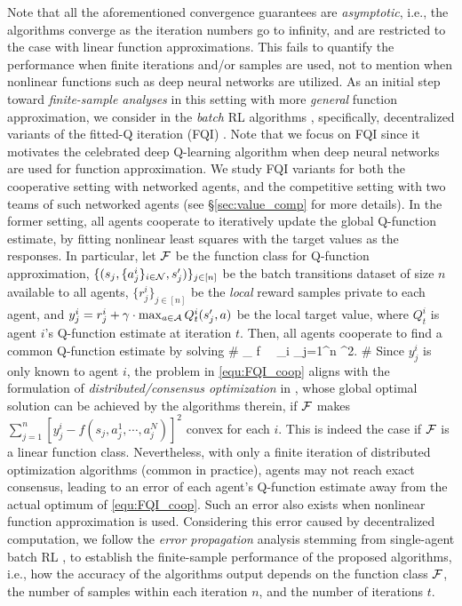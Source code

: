 Note that all the aforementioned convergence guarantees are \emph{asymptotic}, i.e., the algorithms converge as the iteration  numbers go to infinity, and are restricted to the case with linear function approximations. This fails to quantify the performance when  finite iterations and/or samples are used, not to mention when nonlinear functions such as deep neural networks are utilized. As an initial step toward \emph{finite-sample analyses} in this setting with  more \emph{general} function approximation, we consider   in \cite{zhang2018finite} the \emph{batch} RL algorithms \cite{lange2012batch}, specifically, decentralized variants of the fitted-Q iteration (FQI) \cite{riedmiller2005neural,antos2008fitted}. Note that we focus on FQI since it  motivates the celebrated deep Q-learning algorithm \cite{mnih2015human} when  deep neural networks are used for function approximation. 
We study FQI variants for both the cooperative setting with networked agents, and the competitive setting with two teams of such networked agents (see \S\ref{sec:value_comp} for more details). In the former setting,   all agents cooperate to iteratively update the global Q-function estimate, by fitting nonlinear least squares with the target values as the responses. In particular, let $\mathcal{F}$ be the  function class for Q-function approximation, $\{(s_j,\{a^i_j\}_{i\in\mathcal{N}},s_{j}')\}_{j\in[n]}$ be the batch transitions dataset of size $n$  available to all agents, $\{r^i_j\}_{j\in[n]}$ be the \emph{local} reward samples private to each agent, and $y^i_j=r^i_j+\gamma\cdot \max_{a\in\mathcal{A}}Q^i_t(s_{j}',a)$  be the local target value, where $Q^i_t$ is agent $i$'s Q-function estimate at iteration  $t$. Then,  all agents cooperate to find a common Q-function estimate by  solving
\#\label{equ:FQI_coop}
\min_{ f\in \cF}~~ \sum_{i\in\cN} \sum_{j=1}^n ^2.  
\#
Since $y^i_j$ is only known to agent $i$, the problem in \eqref{equ:FQI_coop} aligns with the formulation of \emph{distributed/consensus optimization} in \cite{nedic2009distributed,agarwal2011distributed,jakovetic2011cooperative,tu2012diffusion,hong2017stochastic,nedic2017achieving}, whose global optimal  solution can be achieved by the algorithms therein, if  $\mathcal{F}$ makes  $\sum_{j=1}^n  [ y^i_j - f(s_j, a_j^1, \cdots,a_j^N)  ]^2$ convex for each $i$. This is indeed the case if $\mathcal{F}$ is a linear function class. Nevertheless, with only a finite iteration of  distributed optimization algorithms (common in practice), agents may not reach exact consensus, leading to an error of each agent's Q-function estimate away from the actual optimum of \eqref{equ:FQI_coop}. Such an error also exists when nonlinear function approximation is used.  Considering this error caused by decentralized computation, we follow the \emph{error propagation} analysis stemming  from single-agent batch RL \cite{munos2007performance,munos2008finite,antos2008fitted,antos2008learning,farahmand2010error}, to establish the finite-sample performance of the proposed algorithms, i.e., how the accuracy of the algorithms output   depends on the function class $\mathcal{F}$, the number of samples within each iteration $n$, and the number of iterations $t$. 


